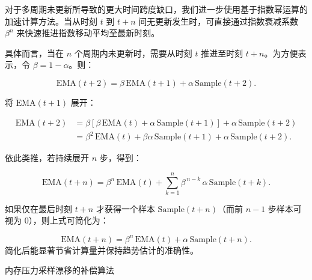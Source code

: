 对于多周期未更新所导致的更大时间跨度缺口，我们进一步使用基于指数幂运算的加速计算方法。当从时刻 \(t\) 到 \(t+n\) 间无更新发生时，可直接通过指数衰减系数 \(\beta^n\) 来快速推进指数移动平均至最新时刻。

具体而言，当在 \(n\) 个周期内未更新时，需要从时刻 \(t\) 推进至时刻 \(t+n\)。为方便表示，令 \(\beta = 1-\alpha\)。则：

\begin{equation}
\text{EMA}(t+2) = \beta \,\text{EMA}(t+1) + \alpha \,\text{Sample}(t+2).
\end{equation}

将 \(\text{EMA}(t+1)\) 展开：

\begin{equation}
\begin{aligned}
\text{EMA}(t+2)
&= \beta \left[\beta\,\text{EMA}(t) + \alpha\,\text{Sample}(t+1)\right] + \alpha\,\text{Sample}(t+2) \\
&= \beta^2 \,\text{EMA}(t) + \beta \alpha\,\text{Sample}(t+1) + \alpha\,\text{Sample}(t+2).
\end{aligned}
\end{equation}

依此类推，若持续展开 \(n\) 步，得到：

\begin{equation}
\text{EMA}(t+n) = \beta^n \,\text{EMA}(t) + \sum_{k=1}^{n} \beta^{\,n-k} \, \alpha \,\text{Sample}(t+k).
\end{equation}

如果仅在最后时刻 \(t+n\) 才获得一个样本 \(\text{Sample}(t+n)\)（而前 \(n-1\) 步样本可视为 0），则上式可简化为：

\begin{equation}
\label{eq:EMA_2}
\text{EMA}(t+n) = \beta^n \,\text{EMA}(t) + \alpha \,\text{Sample}(t+n).
\end{equation}
简化后能显著节省计算量并保持趋势估计的准确性。

\begin{algorithm}[H]
    \caption{内存压力采样漂移的补偿算法}
    \label{alg:mp-drift-compensation}

    \SetAlgoLined
    \LinesNumbered
\end{algorithm}

